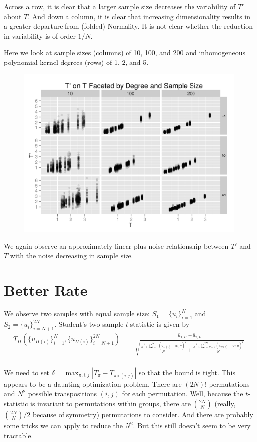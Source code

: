 Across a row, it is clear that a larger sample size decreases the
variability of $T'$ about $T$.  And down a column, it is clear that
increasing dimensionality results in a greater departure from (folded)
Normality.  It is not clear whether the reduction in variability is of
order $1/N$.
\clearpage

Here we look at sample sizes (columns) of 10, 100, and 200 and
inhomogeneous polynomial kernel degrees (rows) of 1, 2, and 5.
\begin{figure}[!ht]
  \centering
  \includegraphics{./simulations/ARC/poly_ker_ARC.png}
\end{figure}

We again observe an approximately linear plus noise relationship
between $T'$ and $T$ with the noise decreasing in sample size.

\section{Better Rate}
We observe two samples with equal sample size: $S_1 = \{u_i\}_{i=1}^N$ and $S_2 =
\{u_i\}_{i=N+1}^{2N}$.
Student's two-sample $t$-statistic is given by
\begin{align*}
T_{\Pi}(\{u_{\Pi(i)}\}_{i=1}^N, \{u_{\Pi(i)}\}_{i=N+1}^{2N})
&= \frac{\bar{u}_{1,\Pi} - \bar{u}_{2,\Pi}}{\sqrt{\frac{\frac{1}{N-1}
      \sum_{i=1}^N(u_{\Pi(i)} - \bar{u}_{1,\Pi})^2}{N} + \frac{\frac{1}{N-1}
      \sum_{i=N+1}^{2N}(u_{\Pi(i)} - \bar{u}_{2,\Pi})^2}{N}}} \\
\end{align*}

We need to set $\delta = \max_{\pi, i, j} |T_{\pi} - T_{\pi \circ (i, j)}|$
so that the bound is tight.  This appears to be a daunting
optimization problem.  There are $(2N)!$ permutations and $N^2$
possible transpositions $(i, j)$ for each permutation.  Well, because the
$t$-statistic is invariant to permutations within groups, there are
$\binom{2N}{N}$ (really, $\binom{2N}{N} / 2$ because of symmetry)
permutations to consider.  And there are probably some tricks we can
apply to reduce the $N^2$.  But this still doesn't seem to be very
tractable.

